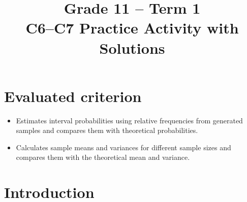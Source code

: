 \makeatletter
{}
\makeatother





\usepackage{longtable}

\setlength{\DistributionGraphWidth}{0.45\textwidth}
\setlength{\DistributionGraphHeight}{4cm}

\title{Grade 11 -- Term 1 \\ C6--C7 Practice Activity with Solutions}
\author{}
\date{}

\pagestyle{empty}




	\maketitle
	\setcounter{tocdepth}{1}
	\setcounter{secnumdepth}{2}
	\label{toc}
	\tableofcontents
	
	\section*{Evaluated criterion}
	\begin{itemize}
		\item [\textbf{C6.}] Estimates interval probabilities using relative frequencies from generated samples and compares them with theoretical probabilities.
		
		\item [\textbf{C7.}] Calculates sample means and variances for different sample sizes and compares them with the theoretical mean and variance.
		
		
	\end{itemize}
	
	\vspace{-4mm}
	

\section{Introduction}
\label{sec:c6-introduction}

